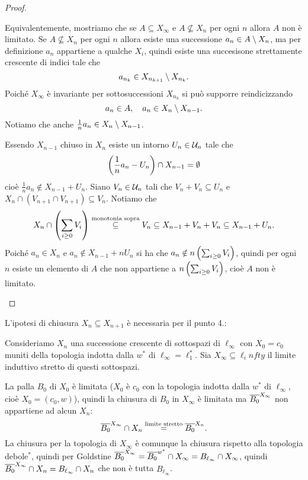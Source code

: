 \begin{proof}
\begin{enumerate}
Equivalentemente, mostriamo che se $A\subseteq X_\infty$ e $A\not\subseteq X_n$ per ogni $n$ allora $A$ non \`e limitato. Se $A\not\subseteq X_n$ per ogni $n$ allora esiste una successione $a_n\in A\bs X_n$, ma per definizione $a_n$ appartiene a qualche $X_i$, quindi esiste una succesisone strettamente crescente di indici tale che
\[a_{n_k}\in X_{n_{k+1}}\bs X_{n_k}.\]
Poich\'e $X_\infty$ \`e invariante per sottosuccessioni $X_{n_k}$ si pu\`o supporre reindicizzando
\[a_n\in A,\quad a_n\in X_n\bs X_{n-1}.\]
Notiamo che anche $\frac1na_n\in X_{n}\bs X_{n-1}$.

Essendo $X_{n-1}$ chiuso in $X_n$ esiste un intorno $U_n\in \Uc_n$ tale che
\[\pa{\frac1n a_n-U_n}\cap X_{n-1}=\emptyset\]
cio\`e $\frac1n a_n\notin X_{n-1}+U_n$. Siano
$V_n\in \Uc_n$ tali che $V_n+V_n\subseteq U_n$ e $X_n\cap (V_{n+1}\cap V_{n+1})\subseteq V_n$. Notiamo che
\[X_n\cap\pa{\sum_{i\geq 0}V_i}\pasgnl\subseteq{monotonia sopra}V_n\subseteq X_{n-1}+V_n+V_n\subseteq X_{n-1}+U_n.\]
Poich\'e $a_n\in X_n$ e $a_n\notin X_{n-1}+nU_n$ si ha che $a_n\notin n\pa{\sum_{i\geq 0}V_i}$, quindi per ogni $n$ esiste un elemento di $A$ che non appartiene a $n\pa{\sum_{i\geq 0}V_i}$, cio\`e $A$ non \`e limitato.
\end{enumerate}
\setlength{\leftmargini}{0.5cm}
\end{proof}

\begin{example}
L'ipotesi di chiusura $X_n\subseteq X_{n+1}$ \`e necessaria per il punto 4.:


Consideriamo $X_n$ una successione crescente di sottospazi di $\ell_\infty$ con $X_0=c_0$ muniti della topologia indotta dalla $w^\ast$ di $\ell_\infty=\ell_1^\ast$. Sia $X_\infty\subseteq \ell_infty$ il limite induttivo stretto di questi sottospazi.

La palla $B_0$ di $X_0$ \`e limitata ($X_0$ \`e $c_0$ con la topologia indotta dalla $w^\ast$ di $\ell_\infty$, cio\`e $X_0=(c_0,w)$), quindi la chiusura di $B_0$ in $X_\infty$ \`e limitata ma $\ol{B_0}^{X_\infty}$ non appartiene ad alcun $X_n$:
\[\ol{B_0}^{X_\infty}\cap X_n\pasgnl={limite stretto}\ol{B_0}^{X_n}.\]
La chiusura per la topologia di $X_\infty$ \`e comunque la chiusura rispetto alla topologia debole$^\ast$, quindi per Goldstine $\ol{B_0}^{X_\infty}=\ol{B_0}^{w^\ast}\cap X_\infty=B_{\ell_\infty}\cap X_\infty$, quindi $\ol{B_0}^{X_\infty}\cap X_n=B_{\ell_\infty}\cap X_n$ che non \`e tutta $B_{\ell_\infty}$.
\end{example}


